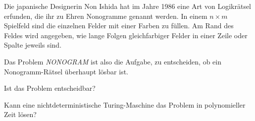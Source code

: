 Die japanische Designerin Non Ishida hat im Jahre 1986 eine Art von
Logikrätsel erfunden, die ihr zu Ehren Nonogramme genannt werden.
In einem $n\times m$ Spielfeld sind die einzelnen Felder mit einer Farben
zu füllen.
Am Rand des Feldes wird angegeben, wie lange Folgen gleichfarbiger
Felder in einer Zeile oder Spalte jeweils sind.

Das Problem {\em NONOGRAM} ist also die Aufgabe, zu entscheiden, ob
ein Nonogramm-Rätsel überhaupt lösbar ist.
\begin{teilaufgaben}
\item Ist das Problem entscheidbar?
\item Kann eine nichtdeterministische Turing-Maschine das Problem in
polynomieller Zeit lösen?
\end{teilaufgaben}

\begin{loesung}
\begin{teilaufgaben}
\item
\item
\end{teilaufgaben}
\end{loesung}




